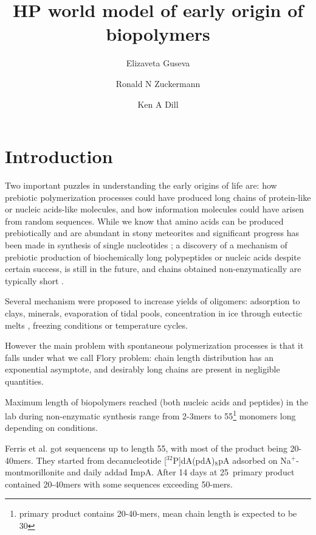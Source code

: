 \documentclass[journal=jacsat,manuscript=article,layout=twocolumn]{achemso}
\author{Elizaveta Guseva}
\affiliation[Stony Brook University]
{Laufer Center for Physical and Quantitative Biology, Stony Brook University, Stony Brook}
\author{Ronald N Zuckermann}
\affiliation{Zuckermann's Lab}
\author{Ken A Dill}
\affiliation[Stony Brook University]
{Laufer Center for Physical and Quantitative Biology, Stony Brook University, Stony Brook}
\title[]
  {HP world model of early origin of biopolymers}
\begin{document}


 
\section{Introduction} 

Two important puzzles in understanding the early origins of life are: how prebiotic polymerization 
processes could have produced long chains of protein-like or nucleic acids-like molecules, and how 
information molecules could have arisen from random sequences.
While we know that amino acids can be produced prebiotically \cite{Miller1953} and are abundant in 
stony meteorites \cite{Sephton2002} and significant progress has been made in synthesis of 
single nucleotides \cite{Powner2009a}; a discovery of a mechanism of prebiotic 
production of biochemically long polypeptides or nucleic acids despite certain success, is 
 still in the future, and chains obtained non-enzymatically are typically short 
\cite{Shock1992,Martin1998,PAECHT-HOROWITZ1970,Lambert2008,Leman2004a,Orgel2004,Ferris1996}.

Several mechanism were proposed to increase yields of oligomers: adsorption to 
clays\cite{Rao1980,Lambert2008}, minerals\cite{Bernal1949,Ferris1996}, evaporation of tidal 
pools\cite{Nelson2001}, concentration in ice through eutectic melts \cite{Kanavarioti2001}, 
freezing conditions\cite{Bada2004} or temperature cycles. 

However the main problem with spontaneous polymerization processes is that it falls under what we 
call Flory problem: chain length distribution has an exponential asymptote, and desirably long 
chains are present in negligible quantities.

Maximum length of biopolymers reached (both nucleic acids and peptides) in the lab 
during non-enzymatic synthesis range from 2-3mers to 
55\footnote{primary product contains 20-40-mers, mean chain length is expected to be 
30\cite{Ferris1996}} monomers long depending on conditions.  

Ferris et al.\cite{Ferris1996} got sequencens up to length 55, with most of the product being 
20-40mers. They started from decanucleotide [$^{32}$P]dA(pdA)$_8$pA adsorbed on 
Na$^+$-montmorillonite and daily addad ImpA. After 14 days at 25\textcelsius\, primary product 
contained 20-40mers with some sequences exceeding 50-mers.
\end{document}
